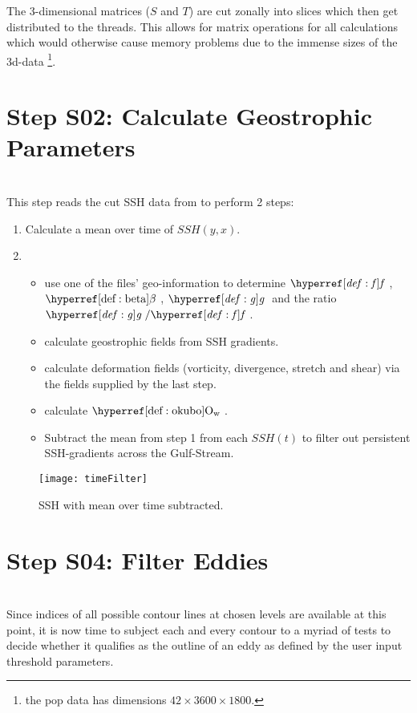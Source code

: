 The 3-dimensional matrices ($S$ and $T$) are cut zonally into slices which then get distributed to the threads. This allows for matrix operations for all calculations which would otherwise cause memory problems due to the immense sizes of the 3d-data \footnote{\Eg the pop data has dimensions $42 \times 3600 \times 1800 $.}.


\section{Step S02: Calculate Geostrophic Parameters}
\\
This step reads the cut SSH data from  to perform 2 steps:
\begin{enumerate}
\item
Calculate a mean over time of $SSH(y,x)$.
	\item
\begin{itemize}
	\item  use one of the files' geo-information to determine $\f$, $\dfdy$,
$\g$ and the ratio $\g/\f$.
\item
 calculate geostrophic fields from SSH gradients.
 \item
 calculate deformation fields (vorticity, divergence, stretch and shear) via the
fields supplied by the last step.
\item calculate $\okubo$.
\item
Subtract the mean from step 1 from each $SSH(t)$ to filter out persistent SSH-gradients \eg across the Gulf-Stream.
\end{itemize}
\end{enumerate}
\begin{figure}
	\texttt{[image: timeFilter]}
	\caption{SSH with mean over time subtracted.}
	\label{fig:timeFilter}
\end{figure}
\section{Step S04: Filter Eddies} \label{S:04}
\\
Since indices of all possible contour lines at chosen levels are available at
this point, it is now time to subject each and every contour to a
myriad of tests to decide whether it qualifies as the outline of an eddy as
defined by the user input threshold parameters.
